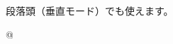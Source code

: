 \documentclass{article}
\makeatletter
\def\Return{\leavevmode\hbox{\@ascgrp @}}
\makeatother
\begin{document}
\parindent0pt
段落頭（垂直モード）でも使えます。\par
\Return
\end{document}

